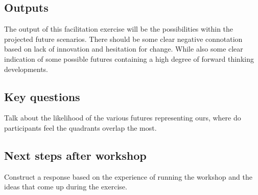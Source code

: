 \subsection{Outputs} 
The output of this facilitation exercise will be the possibilities within the projected future scenarios. There should be some clear negative connotation based on lack of innovation and hesitation for change. While also some clear indication of some possible futures containing a high degree of forward thinking developments.
\subsection{Key questions} 
Talk about the likelihood of the various futures representing ours, where do participants feel the quadrants overlap the most.
\subsection{Next steps after workshop}
Construct a response based on the experience of running the workshop and the ideas that come up during the exercise.
